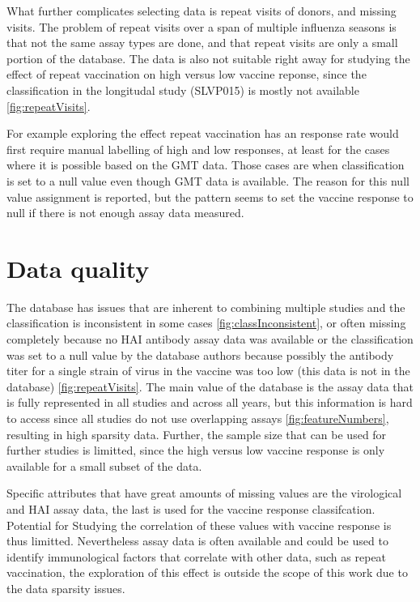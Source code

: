 What further complicates selecting data is repeat visits of donors, and missing
visits. The problem of repeat visits over a span of multiple influenza seasons
is that not the same assay types are done, and that repeat visits are only a
small portion of the database. The data is also not suitable right away for
studying the effect of repeat vaccination on high versus low vaccine reponse,
since the classification in the longitudal study (SLVP015) is mostly not
available \autoref{fig:repeatVisits}.

For example exploring the effect repeat vaccination has an response rate would
first require manual labelling of high and low responses, at least for the
cases where it is possible based on the GMT data. Those cases are when
classification is set to a null value even though GMT data is available.  The
reason for this null value assignment is reported, but the pattern seems to set
the vaccine response to null if there is not enough assay data measured.

\section{Data quality}

The database has issues that are inherent to combining multiple studies and the
classification is inconsistent in some cases \autoref{fig:classInconsistent},
or often missing completely because no HAI antibody assay data was available or
the classification was set to a null value by the database authors because
possibly the antibody titer for a single strain of virus in the vaccine was too
low (this data is not in the database) \autoref{fig:repeatVisits}.  The main value of
the database is the assay data that is fully represented in all studies and
across all years, but this information is hard to access since all studies do
not use overlapping assays \autoref{fig:featureNumbers}, resulting in high
sparsity data. Further, the sample size that can be used for further studies is
limitted, since the high versus low vaccine response is only available for a
small subset of the data.

Specific attributes that have great amounts of missing values are the
virological and HAI assay data, the last is used for the vaccine response
classifcation. Potential for Studying the correlation of these values with
vaccine response is thus limitted. Nevertheless assay data is often available
and could be used to identify immunological factors that correlate with other
data, such as repeat vaccination, the exploration of this effect is outside the
scope of this work due to the data sparsity issues.

